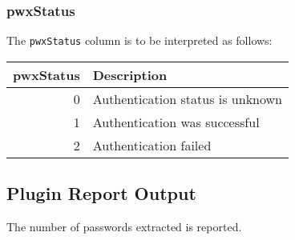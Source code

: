 \documentclass[documentation]{subfiles}
\begin{document}
\subsubsection{pwxStatus}\label{pwxStatus}
The {\tt pwxStatus} column is to be interpreted as follows:
\begin{longtable}{rl}
    \toprule
    {\bf pwxStatus} & {\bf Description}\\
    \midrule\endhead%
    0 & Authentication status is unknown\\
    1 & Authentication was successful\\
    2 & Authentication failed\\
    \bottomrule
\end{longtable}


\subsection{Plugin Report Output}
The number of passwords extracted is reported.
\end{document}
